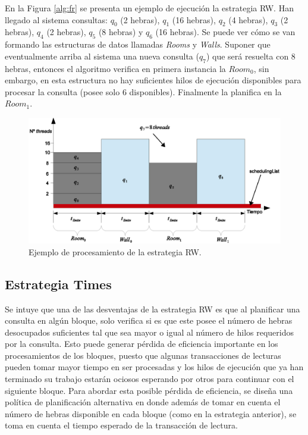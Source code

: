 En la Figura \ref{alg:fr} se presenta un ejemplo de ejecución la estrategia RW. Han llegado al sistema consultas: $q_{0}$ (2 hebras), $q_1$ (16 hebras), $q_2$ (4 hebras), $q_3$ (2 hebras), $q_4$ (2 hebras), $q_5$ (8 hebras) y $q_6$ (16 hebras). Se puede ver cómo se van formando las estructuras de datos llamadas \textit{Rooms} y \textit{Walls}. Suponer que eventualmente arriba al sistema una nueva consulta ($q_7$) que será resuelta con 8 hebras, entonces el algoritmo verifica en primera instancia la $Room_0$, sin embargo, en esta estructura no hay suficientes hilos de ejecución disponibles para procesar la consulta (posee solo 6 disponibles). Finalmente la planifica en la $Room_1$.

\begin{figure}[!th]
\centering
\includegraphics[scale=.75]{images/proceso_FR.eps}
\caption{Ejemplo de procesamiento de la estrategia RW.}
\label{fig:proceso_FR}
\end{figure} 

\subsection{Estrategia Times}
\label{scheduling:times}
Se intuye que una de las desventajas de la estrategia RW es que al planificar una consulta en algún bloque, solo verifica si es que este posee el número de hebras desocupados suficientes tal que sea mayor o igual al número de hilos requeridos por la consulta. Esto puede generar pérdida de eficiencia importante en los procesamientos de los bloques, puesto que algunas transacciones de lecturas pueden tomar mayor tiempo en ser procesadas y los hilos de ejecución que ya han terminado su trabajo estarán ociosos esperando por otros para continuar con el siguiente bloque. Para abordar esta posible pérdida de eficiencia, se diseña una política de planificación alternativa en donde además de tomar en cuenta el número de hebras disponible en cada bloque (como en la estrategia anterior), se toma en cuenta el tiempo esperado de la transacción de lectura.


